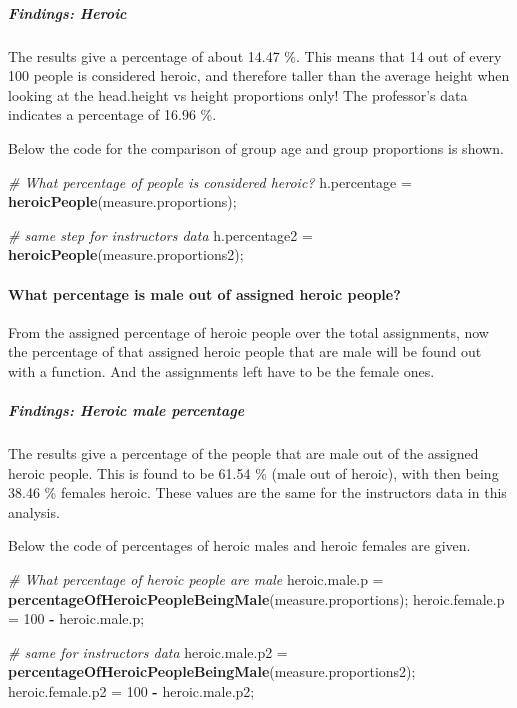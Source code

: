\documentclass[]{article}
\newenvironment{Shaded}{\begin{snugshade}}{\end{snugshade}}
\newcommand{\CommentTok}[1]{\textcolor[rgb]{0.56,0.35,0.01}{\textit{#1}}}
\newcommand{\DecValTok}[1]{\textcolor[rgb]{0.00,0.00,0.81}{#1}}
\newcommand{\KeywordTok}[1]{\textcolor[rgb]{0.13,0.29,0.53}{\textbf{#1}}}
\newcommand{\NormalTok}[1]{#1}
\newcommand{\OperatorTok}[1]{\textcolor[rgb]{0.81,0.36,0.00}{\textbf{#1}}}
\newcommand{\StringTok}[1]{\textcolor[rgb]{0.31,0.60,0.02}{#1}}
\begin{document}
\subparagraph{Findings: Heroic}
\label{sec:appendix-findings-heroic}

The results give a percentage of about 14.47 \%. This means that 14 out
of every 100 people is considered heroic, and therefore taller than the
average height when looking at the head.height vs height proportions
only! The professor's data indicates a percentage of 16.96 \%.

Below the code for the comparison of group age and group proportions is
shown.

\begin{Shaded}
\begin{Highlighting}[]
\CommentTok{\# What percentage of people is considered heroic?}
\NormalTok{h.percentage =}\StringTok{ }\KeywordTok{heroicPeople}\NormalTok{(measure.proportions);}

\CommentTok{\# same step for instructors data}
\NormalTok{h.percentage2 =}\StringTok{ }\KeywordTok{heroicPeople}\NormalTok{(measure.proportions2);}
\end{Highlighting}
\end{Shaded}

\newpage

\paragraph{What percentage is male out of assigned heroic people?}
\label{sec:appendix-heroic-proportions-percentage}

From the assigned percentage of heroic people over the total
assignments, now the percentage of that assigned heroic people that are
male will be found out with a function. And the assignments left have to
be the female ones.

\subparagraph{Findings: Heroic male percentage}
\label{sec:appendix-findings-heroic-male-percentage}

The results give a percentage of the people that are male out of the
assigned heroic people. This is found to be 61.54 \% (male out of
heroic), with then being 38.46 \% females heroic. These values are the
same for the instructors data in this analysis.

Below the code of percentages of heroic males and heroic females are
given.

\begin{Shaded}
\begin{Highlighting}[]
\CommentTok{\# What percentage of heroic people are male}
\NormalTok{heroic.male.p =}\StringTok{ }\KeywordTok{percentageOfHeroicPeopleBeingMale}\NormalTok{(measure.proportions);}
\NormalTok{heroic.female.p =}\StringTok{ }\DecValTok{100} \OperatorTok{{-}}\StringTok{ }\NormalTok{heroic.male.p;}

\CommentTok{\# same for instructors data}
\NormalTok{heroic.male.p2 =}\StringTok{ }\KeywordTok{percentageOfHeroicPeopleBeingMale}\NormalTok{(measure.proportions2);}
\NormalTok{heroic.female.p2 =}\StringTok{ }\DecValTok{100} \OperatorTok{{-}}\StringTok{ }\NormalTok{heroic.male.p2;}
\end{Highlighting}
\end{Shaded}
\end{document}

